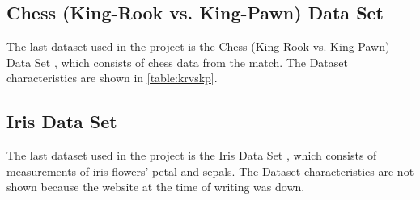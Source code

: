 \subsection{Chess (King-Rook vs. King-Pawn) Data Set}

The last dataset used in the project is the Chess (King-Rook vs. King-Pawn) Data Set \cite{KPvsKRDatasetUCI}, which consists of chess data from the match. The Dataset characteristics are shown in \ref{table:krvskp}.

\begin{table}[ht]
\caption{\label{table:krvskp}Chess (King-Rook vs. King-Pawn) Characteristics}
\end{table}


\subsection{Iris Data Set}

The last dataset used in the project is the Iris Data Set \cite{IrisDatasetUCI}, which consists of measurements of iris flowers' petal and sepals. The Dataset characteristics are not shown because the website at the time of writing was down.
